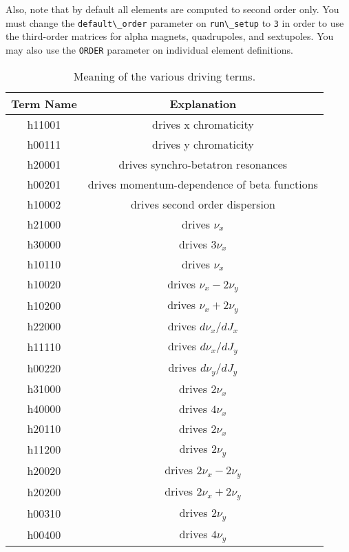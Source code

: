 \documentclass[11pt]{article}
\begin{document}
Also, note that by default all elements are computed to second order
only.  You must change the \verb|default\_order| parameter on
\verb|run\_setup| to \verb|3| in order to use the third-order matrices
for alpha magnets, quadrupoles, and sextupoles.  You may also use the
{\tt ORDER} parameter on individual element definitions.

\begin{table}[htb]\caption{Meaning of the various driving terms\cite{Bengtsson}.}
\begin{center}
\begin{tabular}{|c|c|}\hline
Term Name & Explanation \\  \hline \hline
h11001 & drives x chromaticity \\ \hline
h00111 & drives y chromaticity \\ \hline
h20001 & drives synchro-betatron resonances \\ \hline
h00201 & drives momentum-dependence of beta functions \\ \hline
h10002 & drives second order dispersion \\ \hline
h21000 & drives $\nu_x$ \\ \hline
h30000 & drives $3 \nu_x$ \\ \hline
h10110 & drives $\nu_x$ \\ \hline
h10020 & drives $\nu_x - 2 \nu_y$ \\ \hline
h10200 & drives $\nu_x + 2 \nu_y$ \\ \hline
h22000 & drives $d\nu_x/dJ_x$\\ \hline
h11110 & drives $d\nu_x/dJ_y$ \\ \hline
h00220 & drives $d\nu_y/dJ_y$ \\ \hline
h31000 & drives $2 \nu_x$ \\ \hline
h40000 & drives $4 \nu_x$ \\ \hline
h20110 & drives $2 \nu_x$ \\ \hline
h11200 & drives $2 \nu_y$ \\ \hline
h20020 & drives $2 \nu_x - 2 \nu_y$ \\ \hline
h20200 & drives $2 \nu_x + 2 \nu_y$ \\ \hline
h00310 & drives $2 \nu_y$ \\ \hline
h00400 & drives $4 \nu_y$ \\ \hline
\end{tabular}
\end{center}
\label{tab:drivingTerms}
\end{table}
\end{document}
